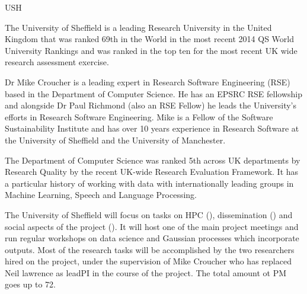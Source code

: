 \begin{sitedescription}{USH}



The University of Sheffield is a leading Research University in the
United Kingdom that was ranked 69th in the World in the most recent
2014 QS World University Rankings and was ranked in the top ten for
the most recent UK wide research assessment exercise.  

Dr Mike Croucher is a leading expert in Research Software Engineering (RSE) 
based in the Department of Computer Science. He has an EPSRC RSE fellowship and 
alongside Dr Paul Richmond (also an RSE Fellow) he leads the University's 
efforts in Research Software Engineering. Mike is a Fellow of the Software
Sustainability Institute and has over 10 years experience in Research Software
at the University of Sheffield and the University of Manchester.


The Department of Computer Science was ranked 5th across UK
departments by Research Quality by the recent UK-wide Research
Evaluation Framework. It has a particular history of working with data
with internationally leading groups in Machine Learning, Speech and
Language Processing.

The University of Sheffield will focus on tasks on HPC (),
dissemination () and social aspects of the project
(). It will host one of the main project meetings
and run regular workshops on data science and Gaussian processes which incorporate
\TheProject outputs. Most of the research tasks will be accomplished by the two researchers hired on the project, under the supervision of Mike Croucher who has replaced Neil lawrence as leadPI in the course of the project. The total amount ot PM goes up to 72.


\end{sitedescription}
